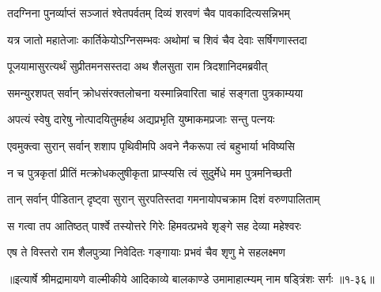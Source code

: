 \twolineshloka
{तदग्निना पुनर्व्याप्तं सञ्जातं श्वेतपर्वतम्}
{दिव्यं शरवणं चैव पावकादित्यसन्निभम्} %

\twolineshloka
{यत्र जातो महातेजाः कार्तिकेयोऽग्निसम्भवः}
{अथोमां च शिवं चैव देवाः सर्षिगणास्तदा} %

\twolineshloka
{पूजयामासुरत्यर्थं सुप्रीतमनसस्तदा}
{अथ शैलसुता राम त्रिदशानिदमब्रवीत्} %

\twolineshloka
{समन्युरशपत् सर्वान् क्रोधसंरक्तलोचना}
{यस्मान्निवारिता चाहं सङ्गता पुत्रकाम्यया} %

\twolineshloka
{अपत्यं स्वेषु दारेषु नोत्पादयितुमर्हथ}
{अद्यप्रभृति युष्माकमप्रजाः सन्तु पत्नयः} %

\twolineshloka
{एवमुक्त्वा सुरान् सर्वान् शशाप पृथिवीमपि}
{अवने नैकरूपा त्वं बहुभार्या भविष्यसि} %

\twolineshloka
{न च पुत्रकृतां प्रीतिं मत्क्रोधकलुषीकृता}
{प्राप्स्यसि त्वं सुदुर्मेधे मम पुत्रमनिच्छती} %

\twolineshloka
{तान् सर्वान् पीडितान् दृष्ट्वा सुरान् सुरपतिस्तदा}
{गमनायोपचक्राम दिशं वरुणपालिताम्} %

\twolineshloka
{स गत्वा तप आतिष्ठत् पार्श्वे तस्योत्तरे गिरेः}
{हिमवत्प्रभवे शृङ्गे सह देव्या महेश्वरः} %

\twolineshloka
{एष ते विस्तरो राम शैलपुत्र्या निवेदितः}
{गङ्गायाः प्रभवं चैव शृणु मे सहलक्ष्मण} %


॥इत्यार्षे श्रीमद्रामायणे वाल्मीकीये आदिकाव्ये बालकाण्डे उमामाहात्म्यम् नाम षड्त्रिंशः सर्गः ॥१-३६॥
